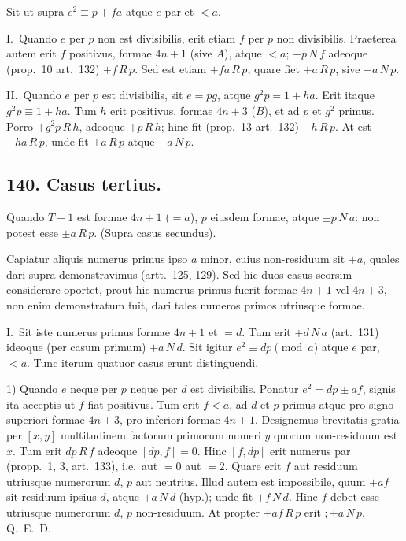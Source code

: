 \documentclass[12pt,a4paper]{article}
\theoremstyle{plain}
\theoremstyle{definition}
\theoremstyle{remark}
\begin{document}
Sit ut supra $e^2 \equiv p + fa$ atque $e$ par et $< a$.

I.\ Quando $e$ per $p$ non est divisibilis, erit etiam $f$ per $p$ non divisibilis.
Praeterea autem erit $f$ positivus, formae $4n+1$ (sive $A$), atque $< a$; $+p \, N \, f$
adeoque (prop.~10 art.~132) $+f \, R \, p$. Sed est etiam $+fa \, R \, p$, quare fiet $+a \, R \, p$,
sive $-a \, N \, p$.

II.\ Quando $e$ per $p$ est divisibilis, sit $e = pg$, atque $g^2p = 1 + ha$. Erit itaque
$g^2p \equiv 1 + ha$. Tum $h$ erit positivus, formae $4n+3$ ($B$), et ad $p$ et $g^2$ primus.
Porro $+g^2p \, R \, h$, adeoque $+p \, R \, h$; hinc fit (prop.~13 art.~132) $-h \, R \, p$. At est
$-ha \, R \, p$, unde fit $+a \, R \, p$ atque $-a \, N \, p$.

\subsection*{140. Casus tertius.}

Quando $T+1$ est formae $4n+1$ ($= a$), $p$ eiusdem formae,
atque $\pm p \, N \, a$: non potest esse $\pm a \, R \, p$. (Supra casus secundus).

Capiatur aliquis numerus primus ipso $a$ minor, cuius non-residuum sit $+a$,
quales dari supra demonstravimus (artt.~125, 129). Sed hic duos casus seorsim
considerare oportet, prout hic numerus primus fuerit formae $4n+1$ vel $4n+3$,
non enim demonstratum fuit, dari tales numeros primos utriusque formae.

I.\ Sit iste numerus primus formae $4n+1$ et $= d$. Tum erit $+d \, N \, a$ (art.~131) ideoque (per casum primum) $+a \, N \, d$. Sit igitur $e^2 \equiv dp \pmod{a}$ atque $e$ par, $< a$. Tunc
iterum quatuor casus erunt distinguendi.

1) Quando $e$ neque per $p$ neque per $d$ est divisibilis. Ponatur $e^2 =
dp \pm af$, signis ita acceptis ut $f$ fiat positivus. Tum erit $f < a$, ad $d$ et $p$
primus atque pro signo superiori formae $4n+3$, pro inferiori formae $4n+1$.
Designemus brevitatis gratia per $[x,y]$ multitudinem factorum primorum numeri
$y$ quorum non-residuum est $x$. Tum erit $dp \, R \, f$ adeoque $[dp,f] = 0$. Hinc
$[f,dp]$ erit numerus par (propp.~1, 3, art.~133), i.e.\ aut $= 0$ aut $= 2$. Quare
erit $f$ aut residuum utriusque numerorum $d$, $p$ aut neutrius. Illud autem est
impossibile, quum $+af$ sit residuum ipsius $d$, atque $+a \, N \, d$ (hyp.); unde fit
$+f \, N \, d$. Hinc $f$ debet esse utriusque numerorum $d$, $p$ non-residuum. At
propter $+af \, R \, p$ erit $;\pm a \, N \, p$. Q.~E.~D.
\end{document}
